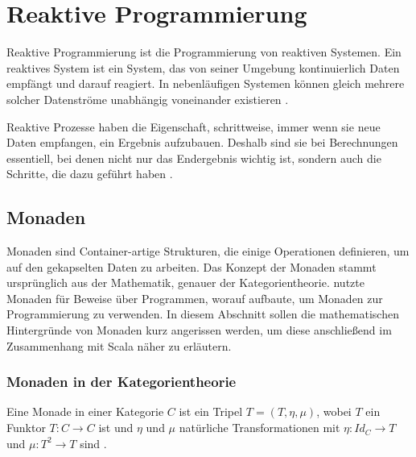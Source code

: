 
\chapter{Reaktive Programmierung} %
\label{cha:reaktive_programmierung}

Reaktive Programmierung ist die Programmierung von reaktiven Systemen.
Ein reaktives System ist ein System, das von seiner Umgebung kontinuierlich Daten empfängt und darauf reagiert.
In nebenläufigen Systemen können gleich mehrere solcher Datenströme unabhängig voneinander existieren \cite[vgl.][S.~1]{reactive_programming}.

Reaktive Prozesse haben die Eigenschaft, schrittweise, immer wenn sie neue Daten empfangen, ein Ergebnis aufzubauen.
Deshalb sind sie bei Berechnungen essentiell, bei denen nicht nur das Endergebnis wichtig ist, sondern auch die Schritte, die dazu geführt haben \cite[vgl.][S.~2]{reactive_programming1}.

\section{Monaden} %
\label{sec:monaden}

Monaden sind Container-artige Strukturen, die einige Operationen definieren, um auf den gekapselten Daten zu arbeiten.
Das Konzept der Monaden stammt ursprünglich aus der Mathematik, genauer der Kategorientheorie.
\citealt{monads_program_structure} nutzte Monaden für Beweise über Programmen, worauf \citealt{monads_programming} aufbaute, um Monaden zur Programmierung zu verwenden.
In diesem Abschnitt sollen die mathematischen Hintergründe von Monaden kurz angerissen werden, um diese anschließend im Zusammenhang mit Scala näher zu erläutern.

\subsection{Monaden in der Kategorientheorie} %
\label{sub:monaden_in_der_kategorientheorie}

Eine Monade in einer Kategorie $C$ ist ein Tripel $T = (T, \eta, \mu)$, wobei $T$ ein Funktor $T: C \to C$ ist und $\eta$ und $\mu$ natürliche Transformationen mit $\eta: Id_C \to T$ und $\mu: T^2 \to T$ sind \citetext{vgl.~\citealp[S.~137]{monads_category_theory}, \citealp[S.~2]{monads_program_structure}}.

